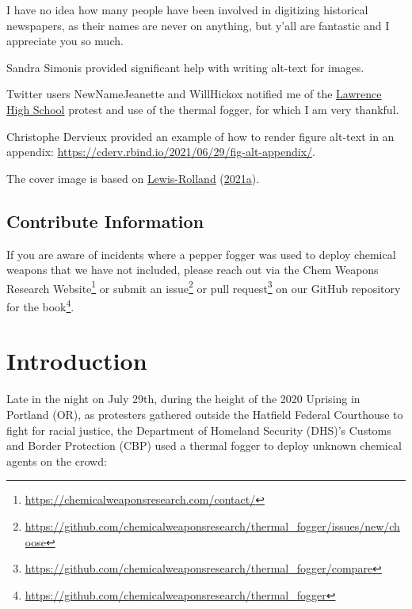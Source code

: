 \documentclass[
  11pt,
]{krantz}
\renewcommand{\href}[2]{#2\footnote{\url{#1}}}
\begin{document}
I have no idea how many people have been involved in digitizing historical newspapers, as their names are never on anything, but y'all are fantastic and I appreciate you so much.

Sandra Simonis provided significant help with writing alt-text for images.

Twitter users NewNameJeanette and WillHickox notified me of the \protect\hyperlink{Lawrence1970_04_21}{Lawrence High School} protest and use of the thermal fogger, for which I am very thankful.

Christophe Dervieux provided an example of how to render figure alt-text in an appendix: \url{https://cderv.rbind.io/2021/06/29/fig-alt-appendix/}.

The cover image is based on \protect\hyperlink{ref-Lewis-Rolland2021a}{Lewis-Rolland} (\protect\hyperlink{ref-Lewis-Rolland2021a}{2021a}).

\hypertarget{contribute-information}{%
\section*{Contribute Information}\label{contribute-information}}


If you are aware of incidents where a pepper fogger was used to deploy chemical weapons that we have not included, please reach out \href{https://chemicalweaponsresearch.com/contact/}{via the Chem Weapons Research Website} or submit an \href{https://github.com/chemicalweaponsresearch/thermal_fogger/issues/new/choose}{issue} or \href{https://github.com/chemicalweaponsresearch/thermal_fogger/compare}{pull request} on our \href{https://github.com/chemicalweaponsresearch/thermal_fogger}{GitHub repository for the book}.

\mainmatter

\hypertarget{introduction}{%
\chapter{Introduction}\label{introduction}}

Late in the night on July 29th, during the height of the 2020 Uprising in Portland (OR), as protesters gathered outside the Hatfield Federal Courthouse to fight for racial justice, the Department of Homeland Security (DHS)'s Customs and Border Protection (CBP) used a thermal fogger to deploy unknown chemical agents on the crowd:
\end{document}
